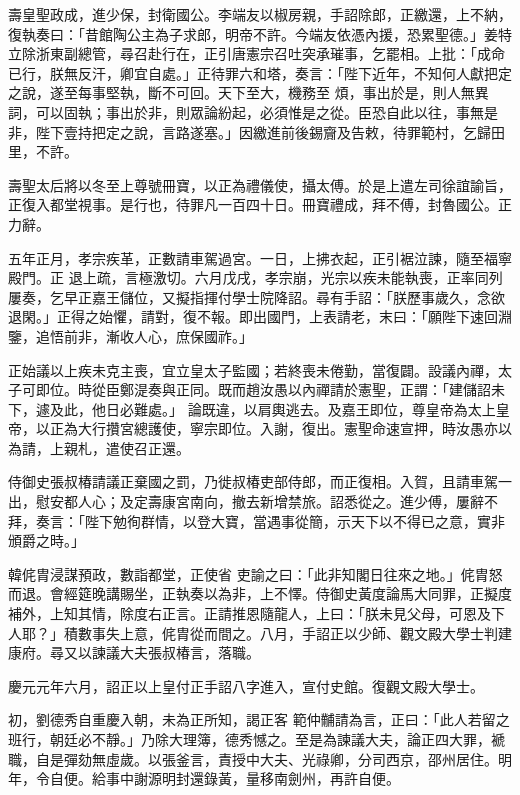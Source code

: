 \begin{pinyinscope}
 壽皇聖政成，進少保，封衛國公。李端友以椒房親，手詔除郎，正繳還，上不納，復執奏曰：「昔館陶公主為子求郎，明帝不許。今端友依憑內援，恐累聖德。」姜特立除浙東副總管，尋召赴行在，正引唐憲宗召吐突承璀事，乞罷相。上批：「成命已行，朕無反汗，卿宜自處。」正待罪六和塔，奏言：「陛下近年，不知何人獻把定之說，遂至每事堅執，斷不可回。天下至大，機務至
 煩，事出於是，則人無異詞，可以固執；事出於非，則眾論紛起，必須惟是之從。臣恐自此以往，事無是非，陛下壹持把定之說，言路遂塞。」因繳進前後錫齎及告敕，待罪範村，乞歸田里，不許。



 壽聖太后將以冬至上尊號冊寶，以正為禮儀使，攝太傅。於是上遣左司徐誼諭旨，正復入都堂視事。是行也，待罪凡一百四十日。冊寶禮成，拜不傅，封魯國公。正力辭。



 五年正月，孝宗疾革，正數請車駕過宮。一日，上拂衣起，正引裾泣諫，隨至福寧殿門。正
 退上疏，言極激切。六月戊戌，孝宗崩，光宗以疾未能執喪，正率同列屢奏，乞早正嘉王儲位，又擬指揮付學士院降詔。尋有手詔：「朕歷事歲久，念欲退閑。」正得之始懼，請對，復不報。即出國門，上表請老，末曰：「願陛下速回淵鑒，追悟前非，漸收人心，庶保國祚。」



 正始議以上疾未克主喪，宜立皇太子監國；若終喪未倦勤，當復闢。設議內禪，太子可即位。時從臣鄭湜奏與正同。既而趙汝愚以內禪請於憲聖，正謂：「建儲詔未下，遽及此，他日必難處。」
 論既違，以肩輿逃去。及嘉王即位，尊皇帝為太上皇帝，以正為大行攢宮總護使，寧宗即位。入謝，復出。憲聖命速宣押，時汝愚亦以為請，上親札，遣使召正還。



 侍御史張叔椿請議正棄國之罰，乃徙叔椿吏部侍郎，而正復相。入賀，且請車駕一出，慰安都人心；及定壽康宮南向，撤去新增禁旅。詔悉從之。進少傅，屢辭不拜，奏言：「陛下勉徇群情，以登大寶，當遇事從簡，示天下以不得已之意，實非頒爵之時。」



 韓侂胄浸謀預政，數詣都堂，正使省
 吏諭之曰：「此非知閣日往來之地。」侂胄怒而退。會經筵晚講賜坐，正執奏以為非，上不懌。侍御史黃度論馬大同罪，正擬度補外，上知其情，除度右正言。正請推恩隨龍人，上曰：「朕未見父母，可恩及下人耶？」積數事失上意，侂胄從而間之。八月，手詔正以少師、觀文殿大學士判建康府。尋又以諫議大夫張叔椿言，落職。



 慶元元年六月，詔正以上皇付正手詔八字進入，宣付史館。復觀文殿大學士。



 初，劉德秀自重慶入朝，未為正所知，謁正客
 範仲黼請為言，正曰：「此人若留之班行，朝廷必不靜。」乃除大理簿，德秀憾之。至是為諫議大夫，論正四大罪，褫職，自是彈劾無虛歲。以張釜言，責授中大夫、光祿卿，分司西京，邵州居住。明年，令自便。給事中謝源明封還錄黃，量移南劍州，再許自便。




\end{pinyinscope}
